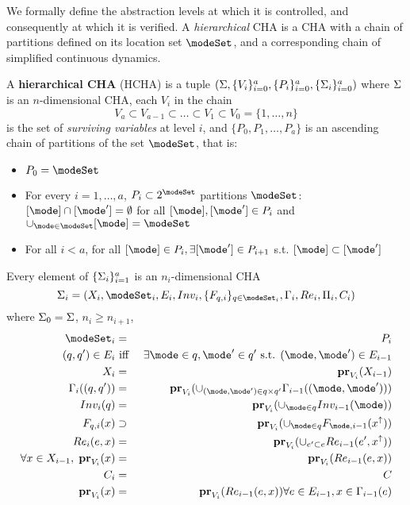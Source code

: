 
We formally define the abstraction levels at which it is controlled, and consequently at which it is verified.
A \emph{hierarchical} CHA is a CHA with a chain of partitions defined on its location set $\modeSet$, and a corresponding chain of simplified continuous dynamics.
\begin{defn}
	A \textbf{hierarchical CHA} (HCHA) is a tuple 
	$(\Sigma, \{V_i\}_{i=0}^{a}, \{P_i\}_{i=0}^{a}, \{\Sigma_i\}_{i=0}^{a})$ where 
	$\Sigma$ is an $n$-dimensional CHA, 
	each $V_i$ in the chain 
	\[V_a \subset V_{a-1} \subset \ldots \subset V_1 \subset V_0=\{1,\ldots,n\}\]
	is the set of \emph{surviving variables} at level $i$, and 
	$\{P_0,P_1,\ldots,P_a\}$ is an ascending chain of partitions of the set $\modeSet$, that is:
	\begin{itemize}
		\item $P_0 = \modeSet$
		\item For every $i =1,\ldots,a$, $P_i \subset 2^\modeSet$ partitions $\modeSet$: $[\mode] \cap [\mode'] = \emptyset$ for all $[\mode],[\mode'] \in P_i$ and $\cup_{\mode\in \modeSet}[\mode] = \modeSet$
		\item For all $i<a$, for all $[\mode]\in P_i, \exists [\mode'] \in P_{i+1}$ s.t. $[\mode] \subset [\mode']$ 
	\end{itemize}
	Every element of $\{\Sigma_i\}_{i=1}^{a}$ is an $n_i$-dimensional CHA 
	\[\Sys_i = (\stSet_i, \modeSet_i, E_i, Inv_i, \{F_{q,i}\}_{q \in \modeSet_i}, \guard_i, \reset_i, \funcOut_i, C_i)\]
	where  $\Sigma_0 = \Sigma$,
	$n_i \geq n_{i+1}$,
	\begin{eqnarray*}
		\modeSet_i &=& P_i
		\\
		(q,q') \in E_i &\text{ iff }& \exists \mode \in q, \mode' \in q' \text{ s.t. } (\mode,\mode') \in E_{i-1}		
		\\
		\stSet_i & = & \proj{\stSet_{i-1}}{V_i} 
		\\
		\guard_i((q,q')) &=& \proj{\cup_{(\mode,\mode') \in q\times q'} \guard_{i-1}((\mode,\mode')) }{V_i}
		\\
		Inv_i(q) &=& \proj{ \cup_{\mode \in q}Inv_{i-1}(\mode)}{V_i}
		\\
		F_{q,i}(x) &\supset & \proj{\cup_{\mode \in q}F_{\mode,i-1}(x^\uparrow)}{V_i}
		\\
		\reset_i(e,x) &=& \proj{\cup_{e' \subset e}\reset_{i-1}(e',x^{\uparrow})}{V_i}
		\\
		\forall x \in \stSet_{i-1},\; \proj{x}{V_i} &=& \proj{\reset_{i-1}(e,x)}{V_i}
		\\
		C_i &=& C
		\\
		\proj{x}{V_i} &=& \proj{\reset_{i-1}(e,x)}{V_i} \forall e \in E_{i-1},x \in \guard_{i-1}(e)
	\end{eqnarray*}
	
\end{defn}
